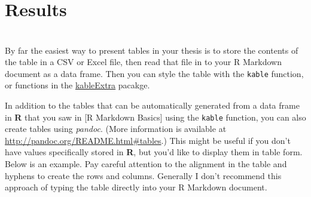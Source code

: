\documentclass [11pt, proquest] {uwthesis}[2015/03/03]
\begin{document}
\chapter{Results}\label{ref-labels}

\chapter{}\label{section}

By far the easiest way to present tables in your thesis is to store the
contents of the table in a CSV or Excel file, then read that file in to
your R Markdown document as a data frame. Then you can style the table
with the \texttt{kable} function, or functions in the
\href{https://cran.r-project.org/web/packages/kableExtra/index.html}{kableExtra}
pacakge.

In addition to the tables that can be automatically generated from a
data frame in \textbf{R} that you saw in {[}R Markdown Basics{]} using
the \texttt{kable} function, you can also create tables using
\emph{pandoc}. (More information is available at
\url{http://pandoc.org/README.html\#tables}.) This might be useful if
you don't have values specifically stored in \textbf{R}, but you'd like
to display them in table form. Below is an example. Pay careful
attention to the alignment in the table and hyphens to create the rows
and columns. Generally I don't recommend this approach of typing the
table directly into your R Markdown document.
\end{document}
